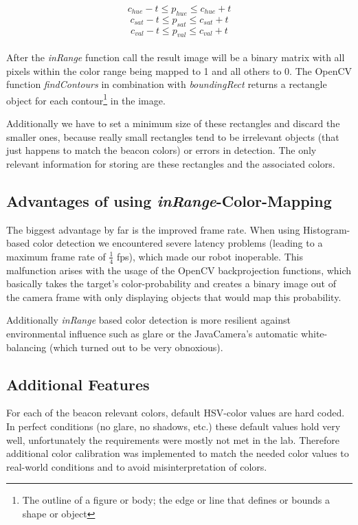 \documentclass[703031]{iisreport}
\begin{document}
\[c_{hue} - t \le p_{hue} \le c_{hue} + t\]
\[c_{sat} - t \le p_{sat} \le c_{sat} + t\]
\[c_{val} - t \le p_{val} \le c_{val} + t\]\\
After the \emph{inRange} function call\cite{opencv_man_arrays} the result image will be a binary matrix with all pixels within the color range being mapped to 1 and all others to 0. The OpenCV function \emph{findContours}\cite{opencv_man_struct_analysis} in combination with \emph{boundingRect}\cite{opencv_man_struct_analysis} returns a rectangle object for each contour\footnote{The outline of a figure or body; the edge or line that defines or bounds a shape or object\cite{dict_contour}} in the image.

Additionally we have to set a minimum size of these rectangles and discard the smaller ones, because really small rectangles tend to be irrelevant objects (that just happens to match the beacon colors) or errors in detection.
The only relevant information for storing are these rectangles and the associated colors.

\subsection{Advantages of using \emph{inRange}-Color-Mapping}
The biggest advantage by far is the improved frame rate. When using Histogram-based color detection we encountered severe latency problems (leading to a maximum frame rate of $\frac{1}{4}$ fps), which made our robot inoperable. This malfunction arises with the usage of the OpenCV backprojection functions, which basically takes the target's color-probability and creates a binary image out of the camera frame with only displaying objects that would map this probability.

Additionally \emph{inRange} based color detection is more resilient against environmental influence such as glare or the JavaCamera's automatic white-balancing (which turned out to be very obnoxious).

\subsection{Additional Features}
For each of the beacon relevant colors, default HSV-color values are hard coded. In perfect conditions (no glare, no shadows, etc.) these default values hold very well, unfortunately the requirements were mostly not met in the lab. Therefore additional color calibration was implemented to match the needed color values to real-world conditions and to avoid misinterpretation of colors.
\end{document}

